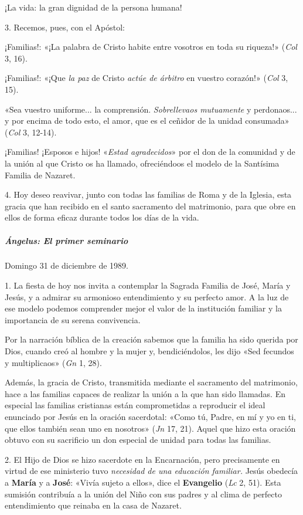 \documentclass[]{article}
\let\oldsubparagraph\subparagraph
\renewcommand{\subparagraph}[1]{\oldsubparagraph{#1}\mbox{}}
\begin{document}
¡La vida: la gran dignidad de la persona humana!

3. Recemos, pues, con el Apóstol:

¡Familias!: «¡La palabra de Cristo habite entre vosotros en toda su
riqueza!» (\emph{Col} 3, 16).

¡Familias!: «¡Que \emph{la paz} de Cristo \emph{actúe de árbitro} en
vuestro corazón!» (\emph{Col} 3, 15).

«Sea vuestro uniforme... la comprensión. \emph{Sobrellevaos mutuamente}
y perdonaos... y por encima de todo esto, el amor, que es el ceñidor de
la unidad consumada» (\emph{Col} 3, 12-14).

¡Familias! ¡Esposos e hijos! «\emph{Estad agradecidos}» por el don de la
comunidad y de la unión al que Cristo os ha llamado, ofreciéndoos el
modelo de la Santísima Familia de Nazaret.

4. Hoy deseo reavivar, junto con todas las familias de Roma y de la
Iglesia, esta gracia que han recibido en el santo sacramento del
matrimonio, para que obre en ellos de forma eficaz durante todos los
días de la vida.

\subparagraph{Ángelus: El primer
seminario}\label{uxe1ngelus-el-primer-seminario}

Domingo 31 de diciembre de 1989.

1. La fiesta de hoy nos invita a contemplar la Sagrada Familia de José,
María y Jesús, y a admirar su armonioso entendimiento y su perfecto
amor. A la luz de ese modelo podemos comprender mejor el valor de la
institución familiar y la importancia de su serena convivencia.

Por la narración bíblica de la creación sabemos que la familia ha sido
querida por Dios, cuando creó al hombre y la mujer y, bendiciéndolos,
les dijo «Sed fecundos y multiplicaos» (\emph{Gn} 1, 28).

Además, la gracia de Cristo, transmitida mediante el sacramento del
matrimonio, hace a las familias capaces de realizar la unión a la que
han sido llamadas. En especial las familias cristianas están
comprometidas a reproducir el ideal enunciado por Jesús en la oración
sacerdotal: «Como tú, Padre, en mí y yo en ti, que ellos también sean
uno en nosotros» (\emph{Jn} 17, 21). Aquel que hizo esta oración obtuvo
con su sacrificio un don especial de unidad para todas las familias.

2. El Hijo de Dios se hizo sacerdote en la Encarnación, pero
precisamente en virtud de ese ministerio tuvo \emph{necesidad de una
educación familiar.} Jesús obedecía a \textbf{María} y a \textbf{José}:
«Vivía sujeto a ellos», dice el \textbf{Evangelio} (\emph{Lc} 2, 51).
Esta sumisión contribuía a la unión del Niño con sus padres y al clima
de perfecto entendimiento que reinaba en la casa de Nazaret.
\end{document}
